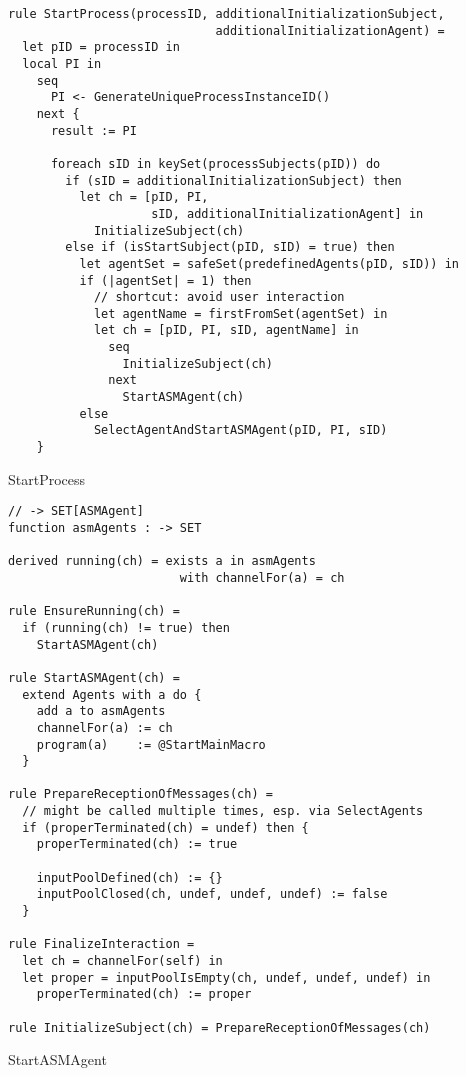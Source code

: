 \begin{listing}[H]
\begin{verbatim}
rule StartProcess(processID, additionalInitializationSubject,
                             additionalInitializationAgent) =
  let pID = processID in
  local PI in
    seq
      PI <- GenerateUniqueProcessInstanceID()
    next {
      result := PI

      foreach sID in keySet(processSubjects(pID)) do
        if (sID = additionalInitializationSubject) then
          let ch = [pID, PI,
                    sID, additionalInitializationAgent] in
            InitializeSubject(ch)
        else if (isStartSubject(pID, sID) = true) then
          let agentSet = safeSet(predefinedAgents(pID, sID)) in
          if (|agentSet| = 1) then
            // shortcut: avoid user interaction
            let agentName = firstFromSet(agentSet) in
            let ch = [pID, PI, sID, agentName] in
              seq
                InitializeSubject(ch)
              next
                StartASMAgent(ch)
          else
            SelectAgentAndStartASMAgent(pID, PI, sID)
    }
\end{verbatim}
\caption{StartProcess}
\label{lst:asm:StartProcess}
\end{listing}


\begin{listing}[H]
\begin{verbatim}
// -> SET[ASMAgent]
function asmAgents : -> SET

derived running(ch) = exists a in asmAgents
                        with channelFor(a) = ch

rule EnsureRunning(ch) =
  if (running(ch) != true) then
    StartASMAgent(ch)

rule StartASMAgent(ch) =
  extend Agents with a do {
    add a to asmAgents
    channelFor(a) := ch
    program(a)    := @StartMainMacro
  }

rule PrepareReceptionOfMessages(ch) =
  // might be called multiple times, esp. via SelectAgents
  if (properTerminated(ch) = undef) then {
    properTerminated(ch) := true

    inputPoolDefined(ch) := {}
    inputPoolClosed(ch, undef, undef, undef) := false
  }

rule FinalizeInteraction =
  let ch = channelFor(self) in
  let proper = inputPoolIsEmpty(ch, undef, undef, undef) in
    properTerminated(ch) := proper

rule InitializeSubject(ch) = PrepareReceptionOfMessages(ch)
\end{verbatim}
\caption{StartASMAgent}
\label{lst:asm:StartASMAgent}
\end{listing}





